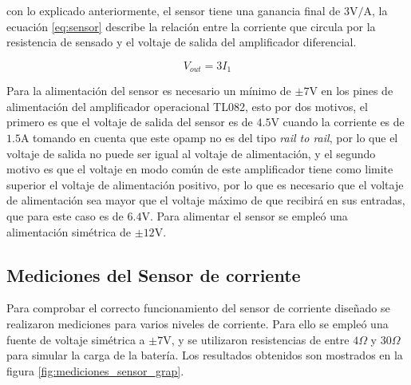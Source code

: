     con lo explicado anteriormente, el sensor tiene una ganancia final de 
    $3\text{V/A}$, la ecuación \ref{eq:sensor} describe la relación entre
    la corriente que circula por la resistencia de sensado y el voltaje de salida
    del amplificador diferencial.

    \begin{equation}
        V_{out} = 3I_1
        \label{eq:sensor}
    \end{equation}
    
    Para la alimentación del sensor es necesario un mínimo de $\pm7\text{V}$ en
    los pines de alimentación del amplificador operacional TL082, esto por dos 
    motivos, el primero es que el voltaje de salida del sensor es de $4.5\text{V}$
    cuando la corriente es de $1.5\text{A}$ tomando en cuenta que este opamp 
    no es del tipo \textit{rail to rail}, por lo que el voltaje de salida no
    puede ser igual al voltaje de alimentación, y el segundo motivo es que el
    voltaje en modo común de este amplificador tiene como limite superior el
    voltaje de alimentación positivo, por lo que es necesario que el voltaje 
    de alimentación sea mayor que el voltaje máximo de que recibirá en sus entradas,
    que para este caso es de $6.4\text{V}$. Para alimentar el sensor se empleó
    una alimentación simétrica de $\pm 12\text{V}$.
    
    \subsection{Mediciones del Sensor de corriente}

    Para comprobar el correcto funcionamiento del sensor de corriente diseñado
    se realizaron mediciones para varios niveles de corriente. Para ello se
    empleó una fuente de voltaje simétrica a $\pm7\text{V}$, y se utilizaron resistencias de entre 
    $4\Omega$ y $30\Omega$ para simular la carga de la batería. Los resultados 
    obtenidos son mostrados en la figura \ref{fig:mediciones_sensor_grap}. 

